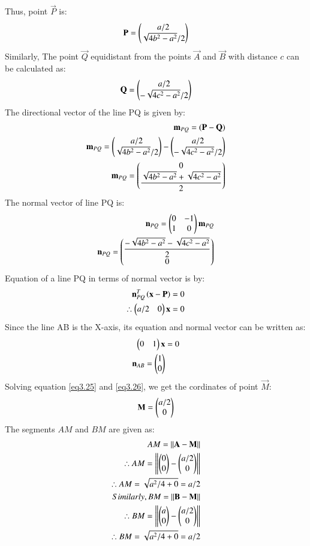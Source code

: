 \documentclass[journal,12pt,twocolumn]{IEEEtran}
\begin{document}
Thus, point $\vec{P}$ is:
\begin{align}
    \mathbf{P}=\begin{pmatrix}a/2\\\sqrt{4b^2-a^2}/2\end{pmatrix}\\
\end{align}
Similarly, The point $\vec{Q}$ equidistant from the points $\vec{A}$ and $\vec{B}$ with distance $c$ can be calculated as:
\begin{align}
    \mathbf{Q}=\begin{pmatrix}a/2\\-\sqrt{4c^2-a^2}/2\end{pmatrix}
\end{align}
The directional vector of the line PQ is given by:
\begin{align}
    \mathbf{m}_{PQ}=(\mathbf{P}-\mathbf{Q})\\
    \mathbf{m}_{PQ}=\begin{pmatrix}a/2\\\sqrt{4b^2-a^2}/2\end{pmatrix}-\begin{pmatrix}a/2\\-\sqrt{4c^2-a^2}/2\end{pmatrix}\\
    \mathbf{m}_{PQ}=\begin{pmatrix}0\\\displaystyle \frac{\sqrt{4b^2-a^2}+\sqrt{4c^2-a^2}}{2}\end{pmatrix}
\end{align}
The normal vector of line PQ is:
\begin{align}
    \mathbf{n}_{PQ} = \begin{pmatrix}0&-1\\1&0\end{pmatrix}\mathbf{m}_{PQ} \\
    \mathbf{n}_{PQ} = \begin{pmatrix}\displaystyle \frac{-\sqrt{4b^2-a^2}-\sqrt{4c^2-a^2}}{2}\\0\end{pmatrix} \label{eq3.23}
\end{align}
Equation of a line PQ in terms of normal vector is by:
\begin{align}
\mathbf{n}_{PQ}^T\left(\mathbf{x}-\mathbf{P}\right) &= 0\\
\therefore \begin{pmatrix}a/2 & 0\end{pmatrix} \mathbf{x} &= 0 \label{eq3.25}
\end{align}
Since the line AB is the X-axis, its equation and normal vector can be written as:
\begin{align}
\begin{pmatrix}0 & 1\end{pmatrix} \mathbf{x} &= 0 \label{eq3.26}\\
\mathbf{n}_{AB}=\begin{pmatrix}1\\0\end{pmatrix} \label{eq3.27}
\end{align}
Solving equation \ref{eq3.25} and \ref{eq3.26}, we get the cordinates of point $\vec{M}$:
\begin{align}
    \mathbf{M}=\begin{pmatrix}a/2\\0\end{pmatrix}
\end{align}
The segments $AM$ and $BM$ are given as:
\begin{align}
    AM=\left\lVert\mathbf{A}-\mathbf{M}\right\rVert \\
    \therefore AM=\left\lVert\begin{pmatrix}0\\0\end{pmatrix}-\begin{pmatrix}a/2\\0\end{pmatrix}\right\rVert\\
    \therefore AM=\sqrt{a^2/4+0}=a/2 \label{eq3.30}\\
    Similarly,BM=\left\lVert\mathbf{B}-\mathbf{M}\right\rVert \\
    \therefore BM=\left\lVert\begin{pmatrix}a\\0\end{pmatrix}-\begin{pmatrix}a/2\\0\end{pmatrix}\right\rVert\\
    \therefore BM=\sqrt{a^2/4+0}=a/2\label{eq3.33}
\end{align}
\end{document}
